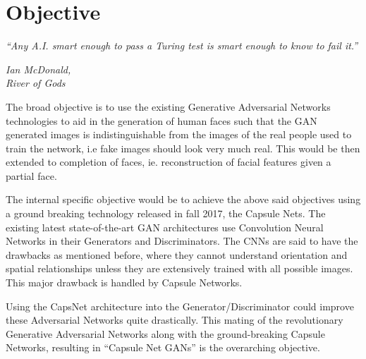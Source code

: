 \chapter{Objective}\label{ch:objective}
\epigraph{\textit{\Large “Any A.I. smart enough to pass a Turing test is smart enough to know to fail it.”}}{\textit{ \large Ian McDonald,\\ River of Gods}}
The broad objective is to use the existing Generative Adversarial Networks technologies to aid in the generation of human faces such that the GAN generated images is indistinguishable from the images of the real people used to train the network, i.e fake images should look very much real. This would be then extended to completion of faces, ie. reconstruction of facial features given a partial face.\par\bigskip
The internal specific objective would be to achieve the above said objectives using a ground breaking technology released in fall 2017, the Capsule Nets. The existing latest state-of-the-art GAN architectures use Convolution Neural Networks in their Generators and Discriminators. The CNNs are said to have the drawbacks as mentioned before, where they cannot understand orientation and spatial relationships unless they are extensively trained with all possible images. This major drawback is handled by Capsule Networks.
\par\bigskip
Using the CapsNet architecture into the Generator/Discriminator could improve these Adversarial Networks quite drastically. This mating of the revolutionary Generative Adversarial Networks along with the ground-breaking Capsule Networks, resulting in “Capsule Net GANs” is the overarching objective.
